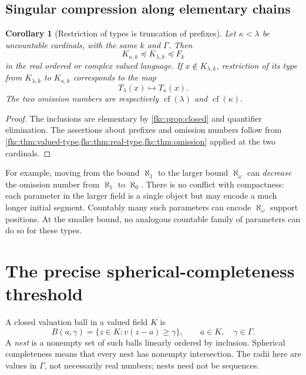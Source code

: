 \documentclass[11pt,letterpaper]{article}
\numberwithin{equation}{section}
\newtheorem{corollary}[theorem]{Corollary}
\theoremstyle{definition}
\theoremstyle{remark}
\newcommand{\cf}{\operatorname{cf}}
\begin{document}
\subsection{Singular compression along elementary chains}
\begin{corollary}[Restriction of types is truncation of prefixes]\label{fkc:cor:tower}
Let $\kappa<\lambda$ be uncountable cardinals, with the same $k$ and $\Gamma$. Then
\[
 K_{\kappa,k}\preccurlyeq K_{\lambda,k}\preccurlyeq F_k
\]
in the real ordered or complex valued language. If $x\notin K_{\lambda,k}$, restriction of its type from $K_{\lambda,k}$ to $K_{\kappa,k}$ corresponds to the map
\[
 T_\lambda(x)\longmapsto T_\kappa(x).
\]
The two omission numbers are respectively $\cf(\lambda)$ and $\cf(\kappa)$.
\end{corollary}
\begin{proof}
The inclusions are elementary by \cref{fkc:prop:closed} and quantifier elimination. The assertions about prefixes and omission numbers follow from \cref{fkc:thm:valued-type,fkc:thm:real-type,fkc:thm:omission} applied at the two cardinals.
\end{proof}

For example, moving from the bound $\aleph_1$ to the larger bound $\aleph_\omega$ can \emph{decrease} the omission number from $\aleph_1$ to $\aleph_0$. There is no conflict with compactness: each parameter in the larger field is a single object but may encode a much longer initial segment. Countably many such parameters can encode $\aleph_\omega$ support positions. At the smaller bound, no analogous countable family of parameters can do so for these types.

\section{The precise spherical-completeness threshold}
\label{fkc:sec:balls}

A closed valuation ball in a valued field $K$ is
\[
 B(a,\gamma)=\{z\in K:v(z-a)\ge\gamma\},\qquad a\in K,\quad\gamma\in\Gamma.
\]
A \emph{nest} is a nonempty set of such balls linearly ordered by inclusion. Spherical completeness means that every nest has nonempty intersection. The radii here are values in $\Gamma$, not necessarily real numbers; nests need not be sequences.
\end{document}
